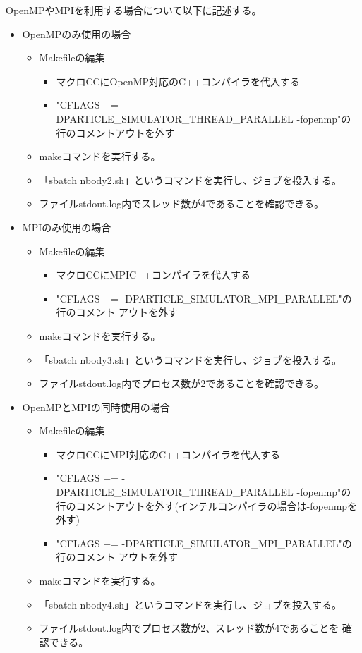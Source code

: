 \documentclass[12pt,a4paper]{jarticle}
\begin{document}
OpenMPやMPIを利用する場合について以下に記述する。
\begin{itemize}
\item OpenMPのみ使用の場合
  \begin{itemize}
  \item Makefileの編集
    \begin{itemize}
    \item マクロCCにOpenMP対応のC++コンパイラを代入する
    \item "CFLAGS += -DPARTICLE\_SIMULATOR\_THREAD\_PARALLEL -fopenmp"の
      行のコメントアウトを外す
    \end{itemize}
  \item makeコマンドを実行する。
  \item 「sbatch nbody2.sh」というコマンドを実行し、ジョブを投入する。
  \item ファイルstdout.log内でスレッド数が4であることを確認できる。
  \end{itemize}

\item MPIのみ使用の場合
  \begin{itemize}
  \item Makefileの編集
    \begin{itemize}
    \item マクロCCにMPIC++コンパイラを代入する
    \item "CFLAGS += -DPARTICLE\_SIMULATOR\_MPI\_PARALLEL"の行のコメント
      アウトを外す
    \end{itemize}
  \item makeコマンドを実行する。
  \item 「sbatch nbody3.sh」というコマンドを実行し、ジョブを投入する。
  \item ファイルstdout.log内でプロセス数が2であることを確認できる。
  \end{itemize}

\item OpenMPとMPIの同時使用の場合
  \begin{itemize}
  \item Makefileの編集
    \begin{itemize}
    \item マクロCCにMPI対応のC++コンパイラを代入する
    \item "CFLAGS += -DPARTICLE\_SIMULATOR\_THREAD\_PARALLEL -fopenmp"の
      行のコメントアウトを外す(インテルコンパイラの場合は-fopenmpを外す)
    \item "CFLAGS += -DPARTICLE\_SIMULATOR\_MPI\_PARALLEL"の行のコメント
      アウトを外す
    \end{itemize}
  \item makeコマンドを実行する。
  \item 「sbatch nbody4.sh」というコマンドを実行し、ジョブを投入する。
  \item ファイルstdout.log内でプロセス数が2、スレッド数が4であることを
    確認できる。
  \end{itemize}

\end{itemize}
\end{document}
